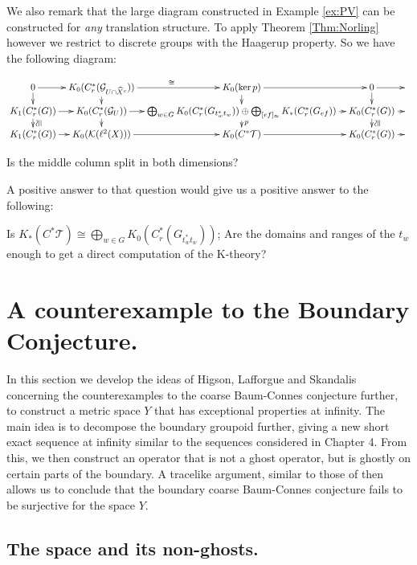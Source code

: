 \begin{example}
We also remark that the large diagram constructed in Example \ref{ex:PV} can be constructed for \textit{any} translation structure. To apply Theorem \ref{Thm:Norling} however we restrict to discrete groups with the Haagerup property. So we have the following diagram:

$$
\xymatrix@=0.7em{ 0 \ar[r]\ar[d] & K_{0}(C^{*}_{r}(\G_{U\cap \widehat{X}^{c}}))\ar[d] \ar[r]^{\cong}& K_{0}(\ker p) \ar[r]\ar[d]& 0 \ar[r]\ar[d] & \\
K_{1}(C^{*}_{r}(G)) \ar[r]\ar[d]^{\ucong} & K_{0}(C^{*}_{r}(\G_{U}))\ar[r]\ar[d]&\bigoplus_{w \in G} K_{0}(C^{*}_{r}(G_{t_{w}^{*}t_{w}})) \oplus \bigoplus_{[ef]_{\approx}} K_{*}(C^{*}_{r}(G_{ef}))\ar[r]\ar[d]^{p}& K_{0}(C^{*}_{r}(G))\ar[r]\ar[d]^{\ucong} &  \\
K_{1}(C^{*}_{r}(G)) \ar[r]& K_{0}(\mathcal{K}(\ell^{2}(X))) \ar[r]& K_{0}(C^{*}\mathcal{T}) \ar[r]& K_{0}(C^{*}_{r}(G)) \ar[r]&  
}
$$

\begin{question}
Is the middle column split in both dimensions?
\end{question}

A positive answer to that question would give us a positive answer to the following:

\begin{question}
Is $K_{*}(C^{*}\mathcal{T}) \cong \bigoplus_{w \in G} K_{0}(C^{*}_{r}(G_{t_{w}^{*}t_{w}}))$; Are the domains and ranges of the $t_{w}$ enough to get a direct computation of the K-theory?
\end{question}

\section{A counterexample to the Boundary Conjecture.}
In this section we develop the ideas of Higson, Lafforgue and Skandalis concerning the counterexamples to the coarse Baum-Connes conjecture further, to construct a metric space $Y$ that has exceptional properties at infinity. The main idea is to decompose the boundary groupoid further, giving a new short exact sequence at infinity similar to the sequences considered in Chapter 4. From this, we then construct an operator that is not a ghost operator, but is ghostly on certain parts of the boundary. A tracelike argument, similar to those of \cite{higsonpreprint, explg1} then allows us to conclude that the boundary coarse Baum-Connes conjecture fails to be surjective for the space $Y$.

\subsection{The space and its non-ghosts.}


\end{example}
